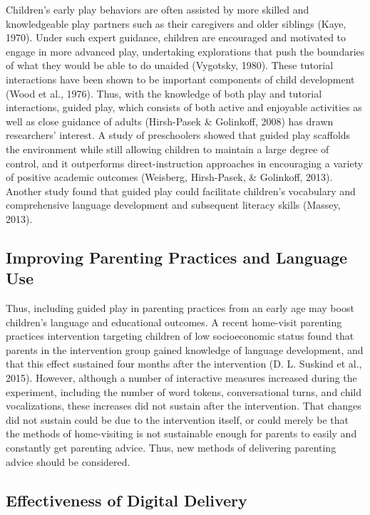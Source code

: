 \documentclass[10pt, letterpaper]{article}
\begin{document}
Children's early play behaviors are often assisted by more skilled and
knowledgeable play partners such as their caregivers and older siblings
(Kaye, 1970). Under such expert guidance, children are encouraged and
motivated to engage in more advanced play, undertaking explorations that
push the boundaries of what they would be able to do unaided (Vygotsky,
1980). These tutorial interactions have been shown to be important
components of child development (Wood et al., 1976). Thus, with the
knowledge of both play and tutorial interactions, guided play, which
consists of both active and enjoyable activities as well as close
guidance of adults (Hirsh-Pasek \& Golinkoff, 2008) has drawn
researchers' interest. A study of preschoolers showed that guided play
scaffolds the environment while still allowing children to maintain a
large degree of control, and it outperforms direct-instruction
approaches in encouraging a variety of positive academic outcomes
(Weisberg, Hirsh-Pasek, \& Golinkoff, 2013). Another study found that
guided play could facilitate children's vocabulary and comprehensive
language development and subsequent literacy skills (Massey, 2013).

\subsection{Improving Parenting Practices and Language
Use}\label{improving-parenting-practices-and-language-use}

Thus, including guided play in parenting practices from an early age may
boost children's language and educational outcomes. A recent home-visit
parenting practices intervention targeting children of low socioeconomic
status found that parents in the intervention group gained knowledge of
language development, and that this effect sustained four months after
the intervention (D. L. Suskind et al., 2015). However, although a
number of interactive measures increased during the experiment,
including the number of word tokens, conversational turns, and child
vocalizations, these increases did not sustain after the intervention.
That changes did not sustain could be due to the intervention itself, or
could merely be that the methods of home-visiting is not sustainable
enough for parents to easily and constantly get parenting advice. Thus,
new methods of delivering parenting advice should be considered.

\subsection{Effectiveness of Digital
Delivery}\label{effectiveness-of-digital-delivery}
\end{document}
